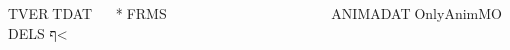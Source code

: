 TVER   TDAT                  *      FRMSANIMADAT   OnlyAnim    MODELS\EDITOR\RANGES
ף<       